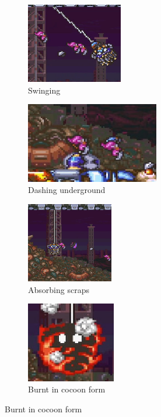 \begin{figure}[htp]
	\centering
	\begin{subfigure}{0.4\linewidth}
		\centering
		\includegraphics[height=3.5cm]{figures/X2/Morph_moth/Moth_swing.jpg}
		\caption{Swinging}
	\end{subfigure}
	\begin{subfigure}{0.5\linewidth}
		\centering
		\includegraphics[height=3.5cm]{figures/X2/Morph_moth/Moth_underground.jpg}
		\caption{Dashing underground}
	\end{subfigure}
	\begin{subfigure}{0.35\linewidth}
		\centering
		\includegraphics[height=3.5cm]{figures/X2/Morph_moth/Moth_absorb.jpg}
		\caption{Absorbing scraps}
	\end{subfigure}
	\begin{subfigure}{0.35\linewidth}
		\centering
		\includegraphics[height=3.5cm]{figures/X2/Morph_moth/Moth_burn.jpg}
		\caption{Burnt in cocoon form}
	\end{subfigure}
\end{figure}
